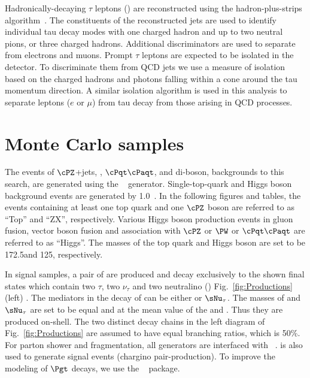 Hadronically-decaying $\tau$ leptons (\Tau) are reconstructed using the hadron-plus-strips algorithm~\cite{Khachatryan:2015dfa}. The constituents of the reconstructed jets are used to identify individual tau decay modes with one charged hadron and up to two neutral pions, or three charged hadrons. 
Additional discriminators are used to separate \Tau from electrons and muons.
Prompt $\tau$ leptons are expected to be isolated in the detector.
To discriminate them from QCD jets we use a measure of isolation 
based on the charged hadrons and photons falling within 
a cone around the tau momentum direction.  A similar isolation algorithm is 
used in this analysis to separate leptons ($e$ or $\mu$) from tau decay from 
those arising in QCD processes.

\section{Monte Carlo samples}
\label{sect:MCSamples}
The events of $\cPZ$+jets, \wjets, $\cPqt\cPaqt$, and di-boson, 
backgrounds to this search, are generated using the ~\cite{Alwall:2011uj} generator. 
Single-top-quark and Higgs boson background events are generated by {\POWHEG} 1.0~\cite{Nason:2004rx,Frixione:2007vw,Alioli:2009je,Alioli:2010xd}.
In the following figures and tables, the events containing at least one top quark and one $\cPZ$ boson are referred to as ``Top'' and ``ZX'', respectively. 
Various Higgs boson production events in gluon fusion, vector boson fusion and association with $\cPZ$ or $\PW$ or $\cPqt\cPaqt$ are referred to as ``Higgs''. The masses of the top quark and Higgs boson are set to be 172.5\GeV and 125\GeV, respectively.

In signal samples, a pair of \chione 
are produced and decay exclusively to the shown final states which contain two $\tau$, two $\nu_{\tau}$ and two neutralino (\PSGczDo) Fig.~\ref{fig:Productions} (left) .
The mediators in the decay of \chione can be either \sTau or $\sNu_{\tau}$. 
The masses of \sTau and $\sNu_{\tau}$ are set to be equal and at the mean value of the \chione and \PSGczDo. Thus they are produced on-shell.
The two distinct decay chains in the left diagram of Fig.~\ref{fig:Productions} are assumed to have equal branching ratios, which is 50\%. For parton shower and fragmentation, all generators are interfaced with ~\cite{Sjostrand:2006za}.
\PYTHIA is also used to generate signal events (chargino pair-production). To improve the modeling of $\Pgt$ decays, 
we use the \TAUOLA~\cite{Davidson:2010rw} package. 


